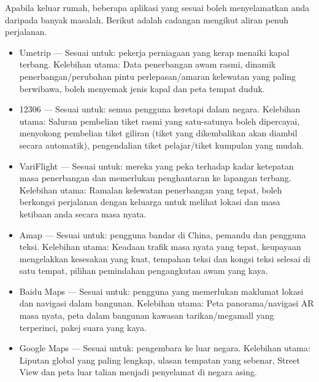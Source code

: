 
Apabila keluar rumah, beberapa aplikasi yang sesuai boleh menyelamatkan anda daripada banyak masalah. Berikut adalah cadangan mengikut aliran penuh perjalanan.


\begin{itemize}
  \item Umetrip — Sesuai untuk: pekerja perniagaan yang kerap menaiki kapal terbang. Kelebihan utama: Data penerbangan awam rasmi, dinamik penerbangan/perubahan pintu perlepasan/amaran kelewatan yang paling berwibawa, boleh menyemak jenis kapal dan peta tempat duduk.
  \item 12306 — Sesuai untuk: semua pengguna keretapi dalam negara. Kelebihan utama: Saluran pembelian tiket rasmi yang satu-satunya boleh dipercayai, menyokong pembelian tiket giliran (tiket yang dikembalikan akan diambil secara automatik), pengendalian tiket pelajar/tiket kumpulan yang mudah.
  \item VariFlight — Sesuai untuk: mereka yang peka terhadap kadar ketepatan masa penerbangan dan memerlukan penghantaran ke lapangan terbang. Kelebihan utama: Ramalan kelewatan penerbangan yang tepat, boleh berkongsi perjalanan dengan keluarga untuk melihat lokasi dan masa ketibaan anda secara masa nyata.
\end{itemize}


\begin{itemize}
  \item Amap — Sesuai untuk: pengguna bandar di China, pemandu dan pengguna teksi. Kelebihan utama: Keadaan trafik masa nyata yang tepat, keupayaan mengelakkan kesesakan yang kuat, tempahan teksi dan kongsi teksi selesai di satu tempat, pilihan pemindahan pengangkutan awam yang kaya.
  \item Baidu Maps — Sesuai untuk: pengguna yang memerlukan maklumat lokasi dan navigasi dalam bangunan. Kelebihan utama: Peta panorama/navigasi AR masa nyata, peta dalam bangunan kawasan tarikan/megamall yang terperinci, pakej suara yang kaya.
  \item Google Maps — Sesuai untuk: pengembara ke luar negara. Kelebihan utama: Liputan global yang paling lengkap, ulasan tempatan yang sebenar, Street View dan peta luar talian menjadi penyelamat di negara asing.
\end{itemize}

